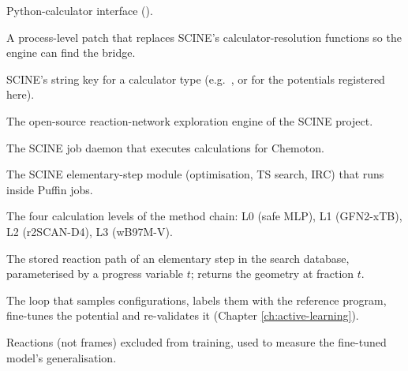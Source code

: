 \begin{description}
    Python-calculator interface ().
  \item[Injection patch] A process-level patch that replaces SCINE's
    calculator-resolution functions so the engine can find the bridge.
  \item[Method family] SCINE's string key for a calculator type (e.g.\
    , or  for the potentials registered here).
  \item[Chemoton] The open-source reaction-network exploration engine of
    the SCINE project.
  \item[Puffin] The SCINE job daemon that executes calculations for
    Chemoton.
  \item[readuct] The SCINE elementary-step module (optimisation, TS search,
    IRC) that runs inside Puffin jobs.
  \item[L0--L3] The four calculation levels of the method chain: L0
    (safe MLP), L1 (GFN2-xTB), L2 (r2SCAN-D4), L3 (wB97M-V).
  \item[Spline] The stored reaction path of an elementary step in the
    search database, parameterised by a progress variable $t$;
     returns the geometry at fraction $t$.
  \item[Active learning] The loop that samples configurations, labels them
    with the reference program, fine-tunes the potential and re-validates
    it (Chapter \ref{ch:active-learning}).
  \item[Held-out set] Reactions (not frames) excluded from training, used
    to measure the fine-tuned model's generalisation.
\end{description}
